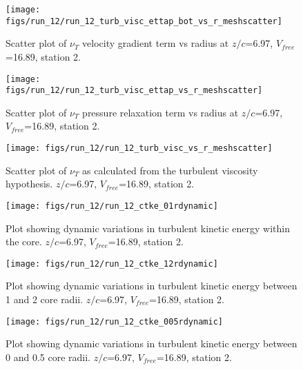 \begin{figure}[H]
\centering
\texttt{[image: figs/run\_12/run\_12\_turb\_visc\_ettap\_bot\_vs\_r\_meshscatter]}
\caption{Scatter plot of $\nu_T$ velocity gradient term vs radius at $z/c$=6.97, $V_{free}$=16.89, station 2.}
\end{figure}


\begin{figure}[H]
\centering
\texttt{[image: figs/run\_12/run\_12\_turb\_visc\_ettap\_vs\_r\_meshscatter]}
\caption{Scatter plot of $\nu_T$ pressure relaxation term vs radius at $z/c$=6.97, $V_{free}$=16.89, station 2.}
\end{figure}


\begin{figure}[H]
\centering
\texttt{[image: figs/run\_12/run\_12\_turb\_visc\_vs\_r\_meshscatter]}
\caption{Scatter plot of $\nu_T$ as calculated from the turbulent viscosity hypothesis. $z/c$=6.97, $V_{free}$=16.89, station 2.}
\end{figure}


\begin{figure}[H]
\centering
\texttt{[image: figs/run\_12/run\_12\_ctke\_01rdynamic]}
\caption{Plot showing dynamic variations in turbulent kinetic energy within the core. $z/c$=6.97, $V_{free}$=16.89, station 2.}
\end{figure}


\begin{figure}[H]
\centering
\texttt{[image: figs/run\_12/run\_12\_ctke\_12rdynamic]}
\caption{Plot showing dynamic variations in turbulent kinetic energy between 1 and 2 core radii. $z/c$=6.97, $V_{free}$=16.89, station 2.}
\end{figure}


\begin{figure}[H]
\centering
\texttt{[image: figs/run\_12/run\_12\_ctke\_005rdynamic]}
\caption{Plot showing dynamic variations in turbulent kinetic energy between 0 and 0.5 core radii. $z/c$=6.97, $V_{free}$=16.89, station 2.}
\end{figure}


